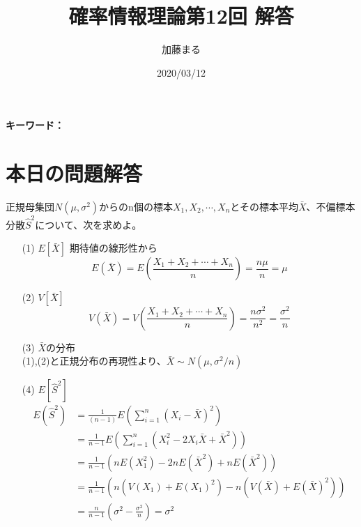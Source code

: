 \documentclass[a4j,uplatex,dvipdfmx]{jsarticle}
\title{確率情報理論第12回 解答}
\author{加藤まる}
\date{2020/03/12}
\begin{document}
\maketitle
\bf キーワード：
\rm

\section*{本日の問題解答}
正規母集団$N(\mu ,\sigma ^2)$からのn個の標本$X_1,X_2,\cdots ,X_n$とその標本平均$\bar{X}$、不偏標本分散$\hat{S}^2$について、次を求めよ。
\begin{itemize}
  \item[(1)] $E[\bar{X}]$
  期待値の線形性から
  \begin{equation}
    E(\bar{X})=E\left( \frac{X_1+X_2+\cdots +X_n}{n} \right) = \frac{n\mu}{n}=\mu
  \end{equation} 
  \item[(2)] $V[\bar{X}]$
  \begin{equation}
    V(\bar{X})=V\left( \frac{X_1+X_2+\cdots+X_n}{n} \right) = \frac{n\sigma ^2}{n^2}=\frac{\sigma ^2}{n}
  \end{equation} 
  \item[(3)] $\bar{X}$の分布\\
  (1),(2)と正規分布の再現性より、$\bar{X}\sim N(\mu,\sigma ^2/n)$
  \item[(4)] $E[\hat{S}^2]$   
  \begin{equation}
    \begin{split}
      E(\hat{S}^2) &=\frac{1}{(n-1)}E\left( \sum_{i=1}^n (X_i-\bar{X})^2 \right) \\ 
      &= \frac{1}{n-1}E\left( \sum_{i=1}^n (X_i^2 - 2X_i\bar{X} + \bar{X}^2) \right) \\
      &= \frac{1}{n-1}(nE(X_1^2)-2nE(\bar{X}^2)+nE(\bar{X}^2))\\
      &= \frac{1}{n-1}(n(V(X_1)+E(X_1)^2)-n(V(\bar{X})+E(\bar{X})^2))\\
      &= \frac{n}{n-1}\left( \sigma ^2 - \frac{\sigma ^2}{n} \right) = \sigma ^2
    \end{split}
  \end{equation} 
\end{itemize}
\end{document}
